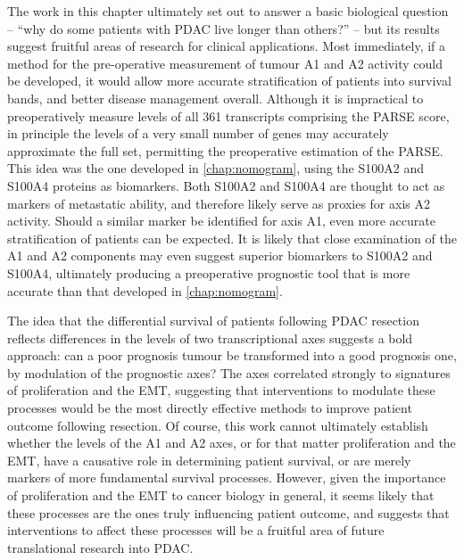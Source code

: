 \documentclass[dissertation.tex]{subfiles}
\begin{document}
The work in this chapter ultimately set out to answer a basic biological question  -- ``why do some patients with \gls{PDAC} live longer than others?'' -- but its results suggest fruitful areas of research for clinical applications.  Most immediately, if a method for the pre-operative measurement of tumour A1 and A2 activity could be developed, it would allow more accurate stratification of patients into survival bands, and better disease management overall.  Although it is impractical to preoperatively measure levels of all 361 transcripts comprising the \gls{PARSE} score, in principle the levels of a very small number of genes may accurately approximate the full set, permitting the preoperative estimation of the \gls{PARSE}.  This idea was the one developed in \cref{chap:nomogram}, using the S100A2 and S100A4 proteins as biomarkers.  Both S100A2 and S100A4 are thought to act as markers of metastatic ability, and therefore likely serve as proxies for axis A2 activity.  Should a similar marker be identified for axis A1, even more accurate stratification of patients can be expected.  It is likely that close examination of the A1 and A2 components may even suggest superior biomarkers to S100A2 and S100A4, ultimately producing a preoperative prognostic tool that is more accurate than that developed in \cref{chap:nomogram}.

The idea that the differential survival of patients following \gls{PDAC} resection reflects differences in the levels of two transcriptional axes suggests a bold approach: can a poor prognosis tumour be transformed into a good prognosis one, by modulation of the prognostic axes?  The axes correlated strongly to signatures of proliferation and the \gls{EMT}, suggesting that interventions to modulate these processes would be the most directly effective methods to improve patient outcome following resection.  Of course, this work cannot ultimately establish whether the levels of the A1 and A2 axes, or for that matter proliferation and the \gls{EMT}, have a causative role in determining patient survival, or are merely markers of more fundamental survival processes.  However, given the importance of proliferation and the \gls{EMT} to cancer biology in general, it seems likely that these processes are the ones truly influencing patient outcome, and suggests that interventions to affect these processes will be a fruitful area of future translational research into \gls{PDAC}.
\end{document}
